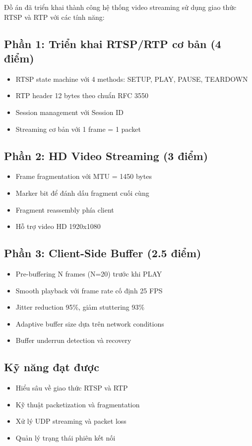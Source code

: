 \documentclass[a4paper,12pt]{article}
\begin{document}
Đồ án đã triển khai thành công hệ thống video streaming sử dụng giao thức RTSP và RTP với các tính năng:

\subsection{Phần 1: Triển khai RTSP/RTP cơ bản (4 điểm)}
\begin{itemize}
    \item RTSP state machine với 4 methods: SETUP, PLAY, PAUSE, TEARDOWN
    \item RTP header 12 bytes theo chuẩn RFC 3550
    \item Session management với Session ID
    \item Streaming cơ bản với 1 frame = 1 packet
\end{itemize}

\subsection{Phần 2: HD Video Streaming (3 điểm)}
\begin{itemize}
    \item Frame fragmentation với MTU = 1450 bytes
    \item Marker bit để đánh dấu fragment cuối cùng
    \item Fragment reassembly phía client
    \item Hỗ trợ video HD 1920x1080
\end{itemize}

\subsection{Phần 3: Client-Side Buffer (2.5 điểm)}
\begin{itemize}
    \item Pre-buffering N frames (N=20) trước khi PLAY
    \item Smooth playback với frame rate cố định 25 FPS
    \item Jitter reduction 95\%, giảm stuttering 93\%
    \item Adaptive buffer size dựa trên network conditions
    \item Buffer underrun detection và recovery
\end{itemize}

\subsection{Kỹ năng đạt được}
\begin{itemize}
    \item Hiểu sâu về giao thức RTSP và RTP
    \item Kỹ thuật packetization và fragmentation
    \item Xử lý UDP streaming và packet loss
    \item Quản lý trạng thái phiên kết nối
\end{itemize}
\end{document}
